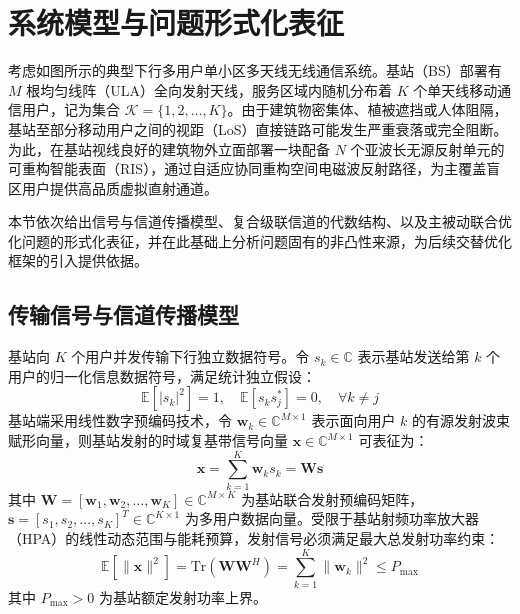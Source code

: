 \section{系统模型与问题形式化表征}
\label{sec:system_model}

考虑如图所示的典型下行多用户单小区多天线无线通信系统。基站（BS）部署有 $M$ 根均匀线阵（ULA）全向发射天线，服务区域内随机分布着 $K$ 个单天线移动通信用户，记为集合 $\mathcal{K} = \{1, 2, \dots, K\}$。由于建筑物密集体、植被遮挡或人体阻隔，基站至部分移动用户之间的视距（LoS）直接链路可能发生严重衰落或完全阻断。为此，在基站视线良好的建筑物外立面部署一块配备 $N$ 个亚波长无源反射单元的可重构智能表面（RIS），通过自适应协同重构空间电磁波反射路径，为主覆盖盲区用户提供高品质虚拟直射通道。

本节依次给出信号与信道传播模型、复合级联信道的代数结构、以及主被动联合优化问题的形式化表征，并在此基础上分析问题固有的非凸性来源，为后续交替优化框架的引入提供依据。

\subsection{传输信号与信道传播模型}
\label{sec:tx_model}

基站向 $K$ 个用户并发传输下行独立数据符号。令 $s_k \in \mathbb{C}$ 表示基站发送给第 $k$ 个用户的归一化信息数据符号，满足统计独立假设：
\begin{equation}
  \mathbb{E}[|s_k|^2] = 1, \quad \mathbb{E}[s_k s_j^*] = 0, \quad \forall k \neq j
  \label{eq:data_symbol_property}
\end{equation}
基站端采用线性数字预编码技术，令 $\bm{w}_k \in \mathbb{C}^{M \times 1}$ 表示面向用户 $k$ 的有源发射波束赋形向量，则基站发射的时域复基带信号向量 $\bm{x} \in \mathbb{C}^{M \times 1}$ 可表征为：
\begin{equation}
  \bm{x} = \sum_{k=1}^K \bm{w}_k s_k = \bm{W} \bm{s}
  \label{eq:bs_transmit_signal}
\end{equation}
其中 $\bm{W} = [\bm{w}_1, \bm{w}_2, \dots, \bm{w}_K] \in \mathbb{C}^{M \times K}$ 为基站联合发射预编码矩阵，$\bm{s} = [s_1, s_2, \dots, s_K]^T \in \mathbb{C}^{K \times 1}$ 为多用户数据向量。受限于基站射频功率放大器（HPA）的线性动态范围与能耗预算，发射信号必须满足最大总发射功率约束：
\begin{equation}
  \mathbb{E}[\|\bm{x}\|^2] = \mathrm{Tr}(\bm{W}\bm{W}^H) = \sum_{k=1}^K \|\bm{w}_k\|^2 \le P_{\max}
  \label{eq:power_constraint}
\end{equation}
其中 $P_{\max} > 0$ 为基站额定发射功率上界。

